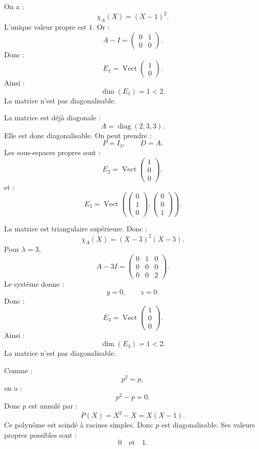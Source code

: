 \documentclass[11pt,a4paper]{article}
\newcommand{\Vect}{\operatorname{Vect}}
\newcommand{\diag}{\operatorname{diag}}
\begin{document}
\begin{correctionbox}[2]
On a :
\[
\chi_A(X)=(X-1)^2.
\]
L'unique valeur propre est \(1\).  
Or :
\[
A-I=
\begin{pmatrix}
0&1\\
0&0
\end{pmatrix}.
\]
Donc :
\[
E_1=\Vect
\begin{pmatrix}
1\\0
\end{pmatrix}.
\]
Ainsi :
\[
\dim(E_1)=1<2.
\]
La matrice n'est pas diagonalisable.
\end{correctionbox}

\begin{correctionbox}[3]
La matrice est déjà diagonale :
\[
A=\diag(2,3,3).
\]
Elle est donc diagonalisable.  
On peut prendre :
\[
P=I_3,
\qquad
D=A.
\]
Les sous-espaces propres sont :
\[
E_2=\Vect
\begin{pmatrix}
1\\0\\0
\end{pmatrix},
\]
et :
\[
E_3=\Vect
\left(
\begin{pmatrix}
0\\1\\0
\end{pmatrix},
\begin{pmatrix}
0\\0\\1
\end{pmatrix}
\right).
\]
\end{correctionbox}

\begin{correctionbox}[4]
La matrice est triangulaire supérieure.  
Donc :
\[
\chi_A(X)=(X-3)^2(X-5).
\]
Pour \(\lambda=3\),
\[
A-3I=
\begin{pmatrix}
0&1&0\\
0&0&0\\
0&0&2
\end{pmatrix}.
\]
Le système donne :
\[
y=0,\qquad z=0.
\]
Donc :
\[
E_3=\Vect
\begin{pmatrix}
1\\0\\0
\end{pmatrix}.
\]
Ainsi :
\[
\dim(E_3)=1<2.
\]
La matrice n'est pas diagonalisable.
\end{correctionbox}

\begin{correctionbox}[5]
Comme :
\[
p^2=p,
\]
on a :
\[
p^2-p=0.
\]
Donc \(p\) est annulé par :
\[
P(X)=X^2-X=X(X-1).
\]
Ce polynôme est scindé à racines simples.  
Donc \(p\) est diagonalisable.  
Ses valeurs propres possibles sont :
\[
0
\quad\text{et}\quad
1.
\]
\end{correctionbox}
\end{document}
